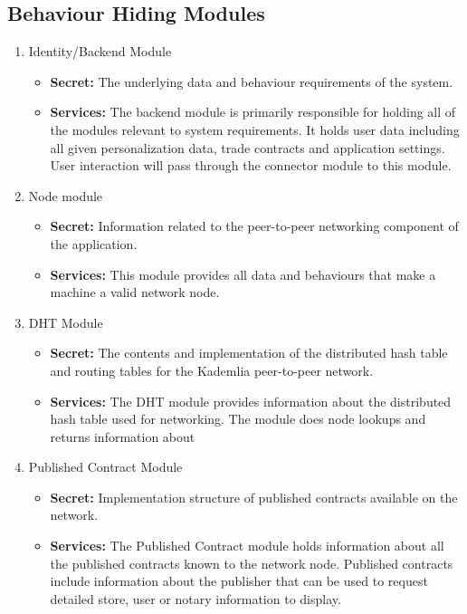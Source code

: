 \documentclass{article}
\begin{document}
\subsection{Behaviour Hiding Modules}
\begin{enumerate}
\item
Identity/Backend Module
\begin{itemize}
\item
\textbf{Secret:} The underlying data and behaviour requirements of the system.

\item
\textbf{Services:} The backend module is primarily responsible for holding all of the modules relevant to system requirements. It holds user data including all given personalization data, trade contracts and application settings. User interaction will pass through the connector module to this module.
\end{itemize}

\item
Node module
\begin{itemize}
\item
\textbf{Secret:} Information related to the peer-to-peer networking component of the application.

\item
\textbf{Services:} This module provides all data and behaviours that make a machine a valid network node.
\end{itemize}

\item
DHT Module
\begin{itemize}
\item
\textbf{Secret:} The contents and implementation of the distributed hash table and routing tables for the Kademlia peer-to-peer network.

\item
\textbf{Services:} The DHT module provides information about the distributed hash table used for networking. The module does node lookups and returns information about 
\end{itemize}

\item
Published Contract Module
\begin{itemize}
\item
\textbf{Secret:} Implementation structure of published contracts available on the network.

\item
\textbf{Services:} The Published Contract module holds information about all the published contracts known to the network node. Published contracts include information about the publisher that can be used to request detailed store, user or notary information to display.
\end{itemize}


\end{enumerate}
\end{document}
